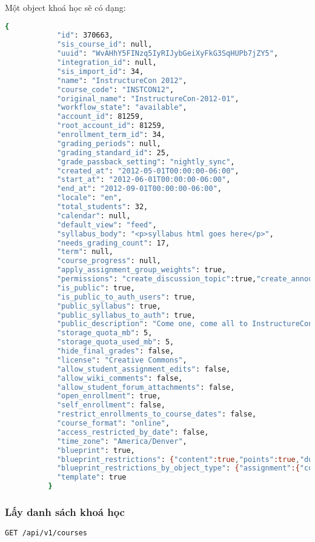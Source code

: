 \documentclass[../Thesis.tex]{subfiles}
\begin{document}
        Một object khoá học sẽ có dạng: 
        \begin{lstlisting}[language=bash]
          {
            "id": 370663,
            "sis_course_id": null,
            "uuid": "WvAHhY5FINzq5IyRIJybGeiXyFkG3SqHUPb7jZY5",
            "integration_id": null,
            "sis_import_id": 34,
            "name": "InstructureCon 2012",
            "course_code": "INSTCON12",
            "original_name": "InstructureCon-2012-01",
            "workflow_state": "available",
            "account_id": 81259,
            "root_account_id": 81259,
            "enrollment_term_id": 34,
            "grading_periods": null,
            "grading_standard_id": 25,
            "grade_passback_setting": "nightly_sync",
            "created_at": "2012-05-01T00:00:00-06:00",
            "start_at": "2012-06-01T00:00:00-06:00",
            "end_at": "2012-09-01T00:00:00-06:00",
            "locale": "en",
            "total_students": 32,
            "calendar": null,
            "default_view": "feed",
            "syllabus_body": "<p>syllabus html goes here</p>",
            "needs_grading_count": 17,
            "term": null,
            "course_progress": null,
            "apply_assignment_group_weights": true,
            "permissions": "create_discussion_topic":true,"create_announcement":true,
            "is_public": true,
            "is_public_to_auth_users": true,
            "public_syllabus": true,
            "public_syllabus_to_auth": true,
            "public_description": "Come one, come all to InstructureCon 2012!",
            "storage_quota_mb": 5,
            "storage_quota_used_mb": 5,
            "hide_final_grades": false,
            "license": "Creative Commons",
            "allow_student_assignment_edits": false,
            "allow_wiki_comments": false,
            "allow_student_forum_attachments": false,
            "open_enrollment": true,
            "self_enrollment": false,
            "restrict_enrollments_to_course_dates": false,
            "course_format": "online",
            "access_restricted_by_date": false,
            "time_zone": "America/Denver",
            "blueprint": true,
            "blueprint_restrictions": {"content":true,"points":true,"due_dates":false,"availability_dates":false},
            "blueprint_restrictions_by_object_type": {"assignment":{"content":true,"points":true},"wiki_page":{"content":true}},
            "template": true
          }
        \end{lstlisting}

        \subsubsection{Lấy danh sách khoá học}
          \begin{lstlisting}[language=bash]
            GET /api/v1/courses
          \end{lstlisting}
\end{document}
